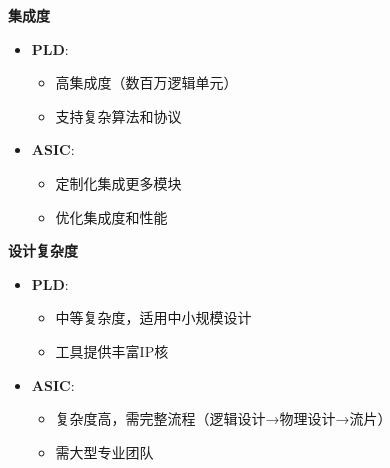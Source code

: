 \documentclass{beamer}
\providecommand{\tightlist}{%
  \setlength{\itemsep}{0pt}\setlength{\parskip}{0pt}}
\begin{document}
\begin{frame}{\textbf{集成度}}

\begin{itemize}
\tightlist
\item
    \textbf{PLD}:

    \begin{itemize}
    \tightlist
    \item
    高集成度（数百万逻辑单元）\\
    \item
    支持复杂算法和协议\\
    \end{itemize}
\item
    \textbf{ASIC}:

    \begin{itemize}
    \tightlist
    \item
    定制化集成更多模块\\
    \item
    优化集成度和性能
    \end{itemize}
\end{itemize}

\textbf{设计复杂度}

\begin{itemize}
\tightlist
\item
    \textbf{PLD}:

    \begin{itemize}
    \tightlist
    \item
    中等复杂度，适用中小规模设计\\
    \item
    工具提供丰富IP核\\
    \end{itemize}
\item
    \textbf{ASIC}:

    \begin{itemize}
    \tightlist
    \item
    复杂度高，需完整流程（逻辑设计→物理设计→流片）\\
    \item
    需大型专业团队
    \end{itemize}
\end{itemize}
\end{frame}
\end{document}

